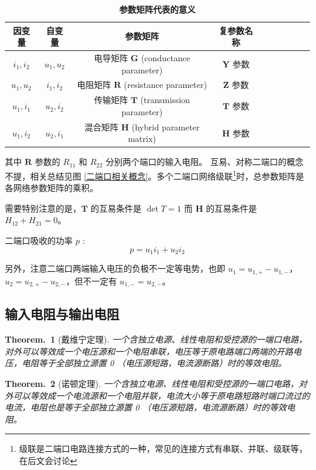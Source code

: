 \documentclass[UTF8]{report}
\theoremstyle{MyLineTheoremStyle} %
\newtheorem{LineTheorem}{Theorem.\,}
\theoremstyle{MyBlockTheoremStyle} %
\theoremstyle{MySubsubsectionStyle} %
\begin{document}
\begin{table}[H]\centering
    \caption{\textbf{参数矩阵代表的意义}}
    \label{参数矩阵代表的意义}
\begin{tabular}{cccccccccc}\toprule
    因变量& 自变量 & 参数矩阵 & 复参数名称\\
    \midrule
    $i_1, i_2$ & $u_1, u_2$ & 电导矩阵 $\boldsymbol{G}$ (conductance parameter) & $\boldsymbol{Y}$ 参数\\
    $u_1, u_2$ & $i_1, i_2$ & 电阻矩阵 $\boldsymbol{R}$ (resistance parameter) & $\boldsymbol{Z}$ 参数\\
    $u_1, i_1$& $u_2, i_2$&  传输矩阵 $\boldsymbol{T}$ (transmission parameter) & $\boldsymbol{T}$ 参数\\
    $u_1, i_2$& $u_2, i_1$&  混合矩阵 $\boldsymbol{H}$ (hybrid parameter matrix) & $\boldsymbol{H}$ 参数\\
    \bottomrule
\end{tabular}
\end{table}

其中 $\boldsymbol{R}$ 参数的 $R_{11}$ 和 $R_{22}$ 分别两个端口的输入电阻。
互易、对称二端口的概念不提，相关总结见图 \ref{二端口相关概念}。多个二端口网络级联\footnote{级联是二端口电路连接方式的一种，常见的连接方式有串联、并联、级联等，在后文会讨论}时，总参数矩阵是各网络参数矩阵的乘积。

需要特别注意的是，$\boldsymbol{T}$ 的互易条件是 $\det T = 1$ 而 $\boldsymbol{H}$ 的互易条件是 $H_{12} + H_{21} = 0$。

二端口吸收的功率 $p$ :
\begin{equation}
    p = u_1i_1 + u_2i_2
\end{equation}

另外，注意二端口两端输入电压的负极不一定等电势，也即 $u_1 = u_{1,+} - u_{1,-}$，$u_2 = u_{2,+} - u_{2,-}$，但不一定有 $u_{1,-} = u_{2,-}$。

\subsection{输入电阻与输出电阻}
\begin{LineTheorem}[戴维宁定理]\label{戴维宁定理}
一个含独立电源、线性电阻和受控源的一端口电路，对外可以等效成一个电压源和一个电阻串联，电压等于原电路端口两端的开路电压，电阻等于全部独立源置 0 （电压源短路，电流源断路）时的等效电阻。
\end{LineTheorem}

\begin{LineTheorem}[诺顿定理]\label{诺顿定理}
一个含独立电源、线性电阻和受控源的一端口电路，对外可以等效成一个电流源和一个电阻并联，电流大小等于原电路短路时端口流过的电流，电阻也是等于全部独立源置 0 （电压源短路，电流源断路）时的等效电阻。
\end{LineTheorem}
\end{document}

